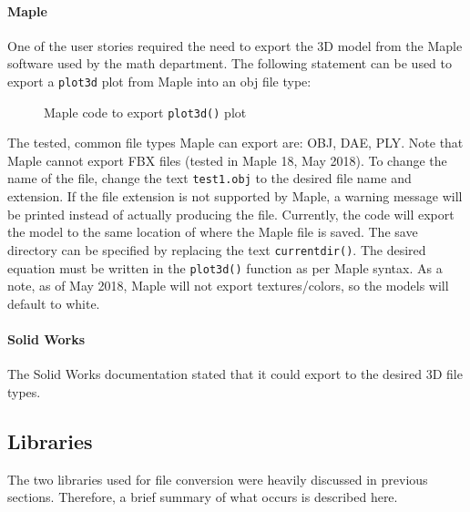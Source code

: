             \paragraph{Maple}

                One of the user stories required the need to export the 3D model from the Maple software used by the math department.  The following statement can be used to export a \texttt{plot3d} plot from Maple into an obj file type:

                \noindent\makebox[\linewidth]{\rule{\textwidth}{0.4pt}}

                \begin{figure}[H]
                    
                    \caption{Maple code to export \texttt{plot3d()} plot}
                \end{figure}

                \noindent\makebox[\linewidth]{\rule{\textwidth}{0.4pt}}                

                The tested, common file types Maple can export are: OBJ, DAE, PLY.  Note that Maple cannot export FBX files (tested in Maple 18, May 2018).  To change the name of the file, change the text \texttt{test1.obj} to the desired file name and extension.  If the file extension is not supported by Maple, a warning message will be printed instead of actually producing the file.  Currently, the code will export the model to the same location of where the Maple file is saved.  The save directory can be specified by replacing the text \texttt{currentdir()}.  The desired equation must be written in the \texttt{plot3d()} function as per Maple syntax.  As a note, as of May 2018, Maple will not export textures/colors, so the models will default to white.

            \paragraph{Solid Works}
                
            The Solid Works documentation stated that it could export to the desired 3D file types.

    \subsection{Libraries}

        The two libraries used for file conversion were heavily discussed in previous sections.  Therefore, a brief summary of what occurs is described here.

